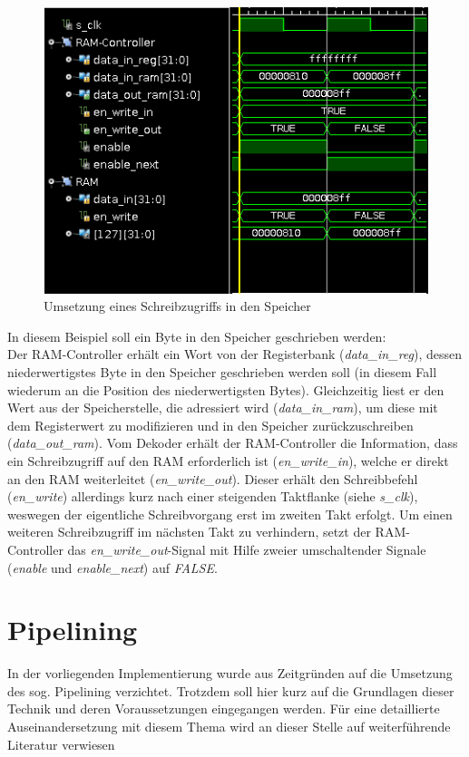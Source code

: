 \begin{figure}[htpb]
    \includegraphics[width=\textwidth]{Figures/write.png}
    \caption{Umsetzung eines Schreibzugriffs in den Speicher}
    \label{fig:write}
\end{figure}

In diesem Beispiel soll ein Byte in den Speicher geschrieben werden:\\
Der RAM-Controller erhält ein Wort von der Registerbank (\textit{data\_in\_reg}), dessen niederwertigstes Byte in den Speicher geschrieben werden soll (in diesem Fall wiederum an die Position des niederwertigsten Bytes).
Gleichzeitig liest er den Wert aus der Speicherstelle, die adressiert wird  (\textit{data\_in\_ram}), um diese mit dem Registerwert zu modifizieren und in den Speicher zurückzuschreiben (\textit{data\_out\_ram}).
Vom Dekoder erhält der RAM-Controller die Information, dass ein Schreibzugriff auf den RAM erforderlich ist (\textit{en\_write\_in}), welche er direkt an den RAM weiterleitet (\textit{en\_write\_out}).
Dieser erhält den Schreibbefehl (\textit{en\_write}) allerdings kurz nach einer steigenden Taktflanke (siehe \textit{s\_clk}), weswegen der eigentliche Schreibvorgang erst im zweiten Takt erfolgt.
Um einen weiteren Schreibzugriff im nächsten Takt zu verhindern, setzt der RAM-Controller das \textit{en\_write\_out}-Signal  mit Hilfe zweier umschaltender Signale (\textit{enable} und \textit{enable\_next}) auf \textit{FALSE}.



\section{Pipelining}
In der vorliegenden Implementierung wurde aus Zeitgründen auf die Umsetzung des sog. Pipelining verzichtet. 
Trotzdem soll hier kurz auf die Grundlagen dieser Technik und deren Voraussetzungen eingegangen werden.
Für eine detaillierte Auseinandersetzung mit diesem Thema wird an dieser Stelle auf weiterführende Literatur verwiesen~\cite[A-2 ff.]{Hennessy}

